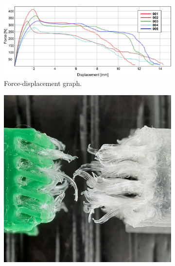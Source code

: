 \begin{figure}
	\centering
	\begin{subfigure}[B]{.99\columnwidth}
		\centering
		\includegraphics[width=\columnwidth]{sources/testing/force_displacement_V.png}
		\caption{Force-displacement graph.}
		\label{fig:force-displacement_diagonal}
	\end{subfigure}
	\setlength{\figwidth}{.19\columnwidth}
	\begin{subfigure}[B]{.99\columnwidth}
		\centering
		\includegraphics[width=\figwidth]{sources/testing/v1_cropped.jpg}

\end{subfigure}
\end{figure}
